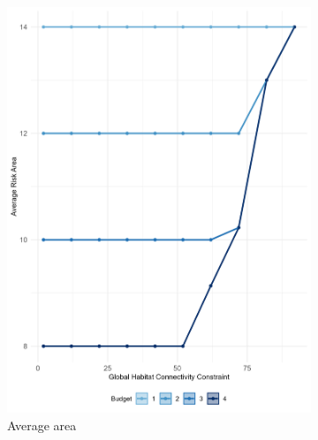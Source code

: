\begin{figure}[h]
    \centering
    \begin{subfigure}[b]{.48\textwidth}
        \centering
        \includegraphics[height = .4\textheight]{figures/wildland/average_areaF.jpg}
        \caption{Average area}
        \label{fig:area}
    \end{subfigure}
    \hfill
    \begin{subfigure}[b]{.48\textwidth}
        \centering

\end{subfigure}
\end{figure}
